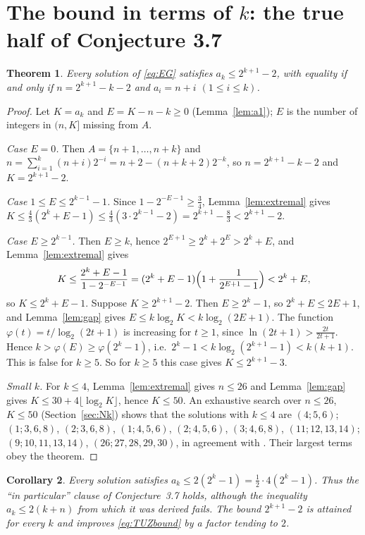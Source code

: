 \documentclass[11pt]{amsart}
\newtheorem{theorem}{Theorem}[section]
\newtheorem{corollary}[theorem]{Corollary}
\theoremstyle{definition}
\theoremstyle{remark}
\begin{document}
\section{The bound in terms of \texorpdfstring{$k$}{k}: the true half of Conjecture 3.7}\label{sec:sharp}

\begin{theorem}\label{thm:sharp}
Every solution of \eqref{eq:EG} satisfies $a_k\le2^{k+1}-2$, with equality if and only if $n=2^{k+1}-k-2$ and $a_i=n+i$ $(1\le i\le k)$.
\end{theorem}

\begin{proof}
Let $K=a_k$ and $E=K-n-k\ge0$ (Lemma~\ref{lem:a1}); $E$ is the number of integers in $(n,K]$ missing from $A$.

\emph{Case $E=0$.} Then $A=\{n+1,\dots,n+k\}$ and $n=\sum_{i=1}^k(n+i)2^{-i}=n+2-(n+k+2)2^{-k}$, so $n=2^{k+1}-k-2$ and $K=2^{k+1}-2$.

\emph{Case $1\le E\le 2^{k-1}-1$.} Since $1-2^{-E-1}\ge\frac34$, Lemma~\ref{lem:extremal} gives
$K\le\frac43(2^k+E-1)\le\frac43(3\cdot2^{k-1}-2)=2^{k+1}-\frac83<2^{k+1}-2$.

\emph{Case $E\ge2^{k-1}$.} Then $E\ge k$, hence $2^{E+1}\ge 2^k+2^E>2^k+E$, and Lemma~\ref{lem:extremal} gives
\[
K\le\frac{2^k+E-1}{1-2^{-E-1}}=(2^k+E-1)\Bigl(1+\frac{1}{2^{E+1}-1}\Bigr)<2^k+E,
\]
so $K\le2^k+E-1$. Suppose $K\ge2^{k+1}-2$. Then $E\ge2^k-1$, so $2^k+E\le 2E+1$, and Lemma~\ref{lem:gap} gives $E\le k\log_2K<k\log_2(2E+1)$. The function $\varphi(t)=t/\log_2(2t+1)$ is increasing for $t\ge1$, since $\ln(2t+1)>\frac{2t}{2t+1}$. Hence $k>\varphi(E)\ge\varphi(2^k-1)$, i.e.\ $2^k-1<k\log_2(2^{k+1}-1)<k(k+1)$. This is false for $k\ge5$. So for $k\ge5$ this case gives $K\le2^{k+1}-3$.

\emph{Small $k$.} For $k\le4$, Lemma~\ref{lem:extremal} gives $n\le26$ and Lemma~\ref{lem:gap} gives $K\le 30+4\lfloor\log_2K\rfloor$, hence $K\le50$. An exhaustive search over $n\le26$, $K\le50$ (Section~\ref{sec:Nk}) shows that the solutions with $k\le4$ are $(4;5,6)$; $(1;3,6,8)$, $(2;3,6,8)$, $(1;4,5,6)$, $(2;4,5,6)$, $(3;4,6,8)$, $(11;12,13,14)$; $(9;10,11,13,14)$, $(26;27,28,29,30)$, in agreement with \cite[Thm.~2.5]{TUZ}. Their largest terms obey the theorem.
\end{proof}

\begin{corollary}\label{cor:half}
Every solution satisfies $a_k\le 2(2^k-1)=\frac12\cdot 4(2^k-1)$. Thus the ``in particular'' clause of Conjecture~3.7 holds, although the inequality $a_k\le 2(k+n)$ from which it was derived fails. The bound $2^{k+1}-2$ is attained for every $k$ and improves \eqref{eq:TUZbound} by a factor tending to $2$.
\end{corollary}
\end{document}
